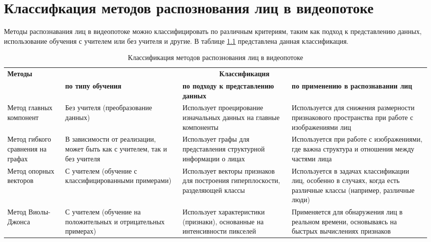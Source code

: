 \chapter{Классифкация методов распознования лиц в видеопотоке}

Методы распознавания лиц в видеопотоке можно классифицировать по различным критериям, таким как подход к представлению данных, использование обучения с учителем или без учителя и другие. В таблице \ref{tab:table} представлена данная классификация.

\begin{table}[h]
    \centering
    \small
    \caption{\label{tab:table} Классификация методов распознования лиц в видеопотоке}
    \begin{tabular}{|p{2cm}|p{3cm}|p{5cm}|p{5cm}|}
        \hline
        \multicolumn{1}{|l|}{\textbf{Методы}} & \multicolumn{3}{c|}{\textbf{Классификация}} \\
        \cline{2-4}
        & \textbf{по типу обучения} & \textbf{по подходу к представлению данных} & \textbf{по применению в распознавании лиц} \\
        \hline
        Метод главных компонент & Без учителя (преобразование данных) & Использует проецирование изначальных данных на главные компоненты & Используется для снижения размерности признакового пространства при работе с изображениями лиц \\
        \hline
        Метод гибкого сравнения на графах & В зависимости от реализации, может быть как с учителем, так и без учителя & Использует графы для представления структурной информации о лицах & Используется при работе с изображениями, где важна структура и отношения между частями лица \\
        \hline
        Метод опорных векторов & С учителем (обучение с классифицированными примерами) & Использует векторы признаков для построения гиперплоскости, разделяющей классы & Используется в задачах классификации лиц, особенно в случаях, когда есть различные классы (например, различные люди) \\
        \hline
        Метод Виолы-Джонса & С учителем (обучение на положительных и отрицательных примерах) & Использует характеристики (признаки), основанные на интенсивности пикселей & Применяется для обнаружения лиц в реальном времени, основываясь на быстрых вычислениях признаков \\
        \hline
    \end{tabular}
\end{table}
